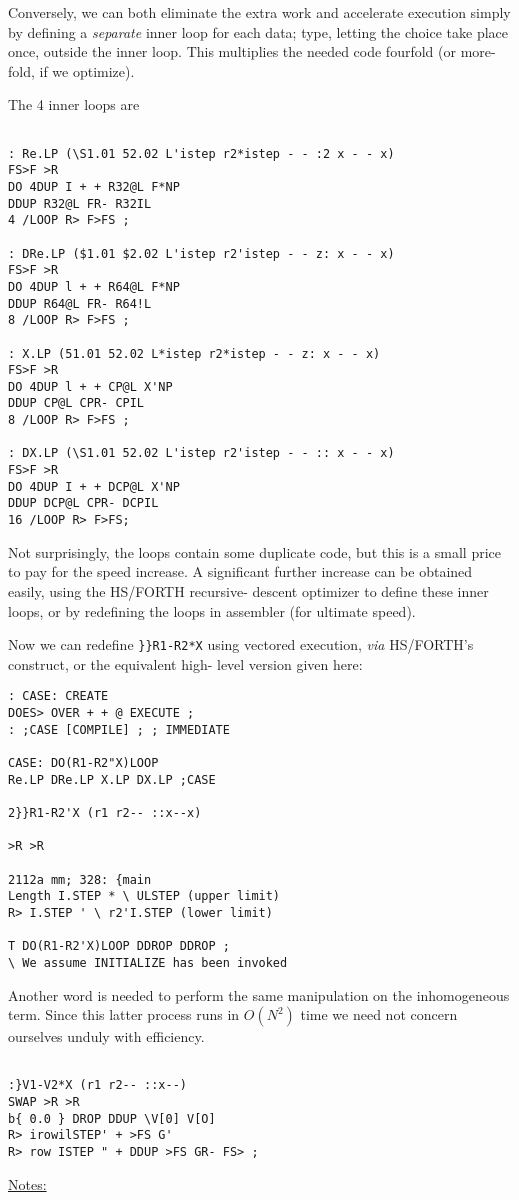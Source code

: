Conversely, we can both eliminate the extra work and accelerate
execution simply by defining a \textit{separate} inner loop for each data;
type, letting the choice take place once, outside the inner loop.
This multiplies the needed code fourfold (or more-fold, if we
optimize).

The 4 inner loops are
\begin{verbatim}

: Re.LP (\S1.01 52.02 L'istep r2*istep - - :2 x - - x)
FS>F >R
DO 4DUP I + + R32@L F*NP
DDUP R32@L FR- R32IL
4 /LOOP R> F>FS ;

: DRe.LP ($1.01 $2.02 L'istep r2'istep - - z: x - - x)
FS>F >R
DO 4DUP l + + R64@L F*NP
DDUP R64@L FR- R64!L
8 /LOOP R> F>FS ;

: X.LP (51.01 52.02 L*istep r2*istep - - z: x - - x)
FS>F >R
DO 4DUP l + + CP@L X'NP
DDUP CP@L CPR- CPIL
8 /LOOP R> F>FS ;

: DX.LP (\S1.01 52.02 L'istep r2'istep - - :: x - - x)
FS>F >R
DO 4DUP I + + DCP@L X'NP
DDUP DCP@L CPR- DCPIL
16 /LOOP R> F>FS;
\end{verbatim} 

Not surprisingly, the loops contain some duplicate code, but this
is a small price to pay for the speed increase. A significant further
increase can be obtained easily, using the HS/FORTH recursive-
descent optimizer to define these inner loops, or by redefining
the loops in assembler (for ultimate speed).

Now we can redefine \verb|}}R1-R2*X| using vectored execution, \textit{via}
HS/FORTH's  construct, or the equivalent high-
level version given here:

\begin{verbatim}
: CASE: CREATE
DOES> OVER + + @ EXECUTE ;
: ;CASE [COMPILE] ; ; IMMEDIATE

CASE: DO(R1-R2"X)LOOP
Re.LP DRe.LP X.LP DX.LP ;CASE

2}}R1-R2'X (r1 r2-- ::x--x)

>R >R

2112a mm; 328: {main
Length I.STEP * \ ULSTEP (upper limit)
R> I.STEP ' \ r2'I.STEP (lower limit)

T DO(R1-R2'X)LOOP DDROP DDROP ;
\ We assume INITIALIZE has been invoked
\end{verbatim} 

Another word is needed to perform the same manipulation on
the inhomogeneous term. Since this latter process runs in $O(N^2)$
time we need not concern ourselves unduly with efficiency.
\begin{verbatim}

:}V1-V2*X (r1 r2-- ::x--)
SWAP >R >R
b{ 0.0 } DROP DDUP \V[0] V[O]
R> irowilSTEP' + >FS G'
R> row ISTEP " + DDUP >FS GR- FS> ;

\end{verbatim} 
\underline{Notes:}

